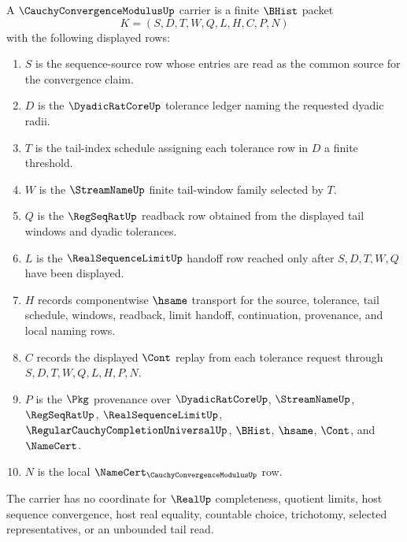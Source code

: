 \begin{definition}
\label{def:cauchy-convergence-modulus-carrier}
A $\CauchyConvergenceModulusUp$ carrier is a finite $\BHist$ packet
$$
K=(S,D,T,W,Q,L,H,C,P,N)
$$
with the following displayed rows:
\begin{enumerate}
\item $S$ is the sequence-source row whose entries are read as the common source for the convergence claim.
\item $D$ is the $\DyadicRatCoreUp$ tolerance ledger naming the requested dyadic radii.
\item $T$ is the tail-index schedule assigning each tolerance row in $D$ a finite threshold.
\item $W$ is the $\StreamNameUp$ finite tail-window family selected by $T$.
\item $Q$ is the $\RegSeqRatUp$ readback row obtained from the displayed tail windows and dyadic tolerances.
\item $L$ is the $\RealSequenceLimitUp$ handoff row reached only after $S,D,T,W,Q$ have been displayed.
\item $H$ records componentwise $\hsame$ transport for the source, tolerance, tail schedule, windows, readback, limit handoff, continuation, provenance, and local naming rows.
\item $C$ records the displayed $\Cont$ replay from each tolerance request through $S,D,T,W,Q,L,H,P,N$.
\item $P$ is the $\Pkg$ provenance over $\DyadicRatCoreUp$, $\StreamNameUp$, $\RegSeqRatUp$, $\RealSequenceLimitUp$, $\RegularCauchyCompletionUniversalUp$, $\BHist$, $\hsame$, $\Cont$, and $\NameCert$.
\item $N$ is the local $\NameCert_{\CauchyConvergenceModulusUp}$ row.
\end{enumerate}
The carrier has no coordinate for $\RealUp$ completeness, quotient limits, host sequence convergence, host real equality, countable choice, trichotomy, selected representatives, or an unbounded tail read.
\end{definition}

